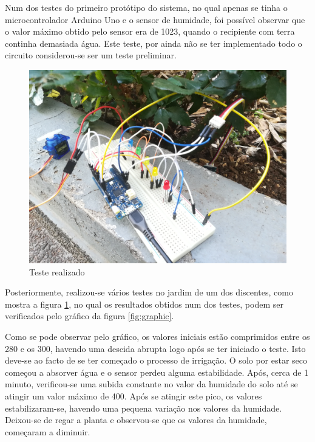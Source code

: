 \documentclass[conference]{IEEEtran}
\begin{document}
Num dos testes do primeiro protótipo do sistema, no qual apenas se tinha o microcontrolador
Arduino Uno e o sensor de humidade, foi possível observar que o valor máximo obtido pelo sensor
era de 1023, quando o recipiente com terra continha demasiada água. Este teste, por ainda
não se ter implementado todo o circuito considerou-se ser um teste preliminar.

\begin{figure}[h]
    \centering
    \includegraphics[scale=0.06]{sistema-de-rega-teste-ambiente-real.jpg}
    \caption{Teste realizado}
    \label{fig:teste}
\end{figure}

Posteriormente, realizou-se vários testes no jardim de um dos discentes, como mostra a figura \ref{fig:teste},
no qual os resultados obtidos num dos testes, podem ser verificados pelo gráfico da figura \ref{fig:graphic}.

Como se pode observar pelo gráfico, os valores iniciais estão comprimidos entre os 280 e os 300,
havendo uma descida abrupta logo após se ter iniciado o teste. Isto deve-se ao facto de se ter começado
o processo de irrigação. O solo por estar seco começou a absorver água e o sensor perdeu alguma estabilidade.
Após, cerca de 1 minuto, verificou-se uma subida constante no valor da humidade do solo até se atingir
um valor máximo de 400. Após se atingir este pico, os valores estabilizaram-se, havendo uma pequena variação
nos valores da humidade. Deixou-se de regar a planta e observou-se que os valores da humidade, começaram
a diminuir.
\end{document}
